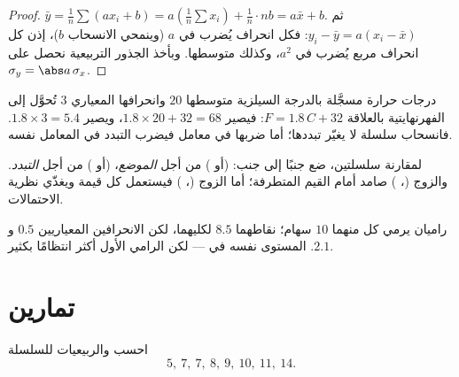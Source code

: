 \begin{proof}
$\bar y = \frac1n \sum (a x_i + b) = a\left(\frac1n\sum x_i\right) +
\frac1n \cdot nb = a\bar x + b$. ثم
$y_i - \bar y = a(x_i - \bar x)$: فكل انحراف يُضرب في $a$
(وينمحي الانسحاب $b$)، إذن كل انحراف مربع يُضرب في $a^2$،
وكذلك متوسطها. وبأخذ الجذور التربيعية نحصل على
$\sigma_y = \abs a\,\sigma_x$.
\end{proof}

\begin{example}
درجات حرارة مسجَّلة بالدرجة السيلزية متوسطها $20$ وانحرافها
المعياري $3$ تُحوَّل إلى الفهرنهايتية بالعلاقة $F = 1.8\,C + 32$: فيصير 
$1.8 \times 20 + 32 = 68$، ويصير 
$1.8 \times 3 = 5.4$. فانسحاب سلسلة لا يغيّر تبددها؛
أما ضربها في معامل فيضرب التبدد في المعامل نفسه.
\end{example}

\begin{method}\label{met:g11:stat:compare}
لمقارنة سلسلتين، ضع جنبًا إلى جنب:  (أو ) من أجل
\emph{الموضع}،  (أو ) من أجل
\emph{التبدد}. والزوج (، ) صامد أمام
القيم المتطرفة؛ أما الزوج (، ) فيستعمل كل قيمة
ويغذّي نظرية الاحتمالات.
\end{method}

\begin{example}
راميان يرمي كل منهما $10$ سهام؛  نقاطهما $8.5$ لكليهما، لكن
الانحرافين المعياريين $0.5$ و $2.1$. المستوى نفسه في  --- لكن
الرامي الأول أكثر انتظامًا بكثير.
\end{example}

\section{تمارين}

\begin{exercise}[$\star$]\label{exo:g11:stat:1}
احسب   والربيعيات  للسلسلة
\[
5,\ 7,\ 7,\ 8,\ 9,\ 10,\ 11,\ 14 .
\]
\end{exercise}

